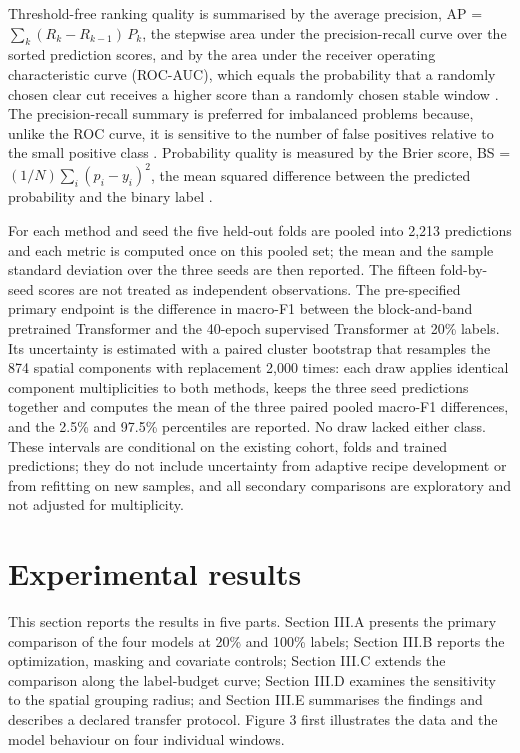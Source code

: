 \documentclass[10pt,a4paper,twocolumn]{article}
\begin{document}
Threshold-free ranking quality is summarised by the average precision, AP = $\sum_k (R_k - R_{k-1})\, P_k$, the stepwise area under the precision-recall curve over the sorted prediction scores, and by the area under the receiver operating characteristic curve (ROC-AUC), which equals the probability that a randomly chosen clear cut receives a higher score than a randomly chosen stable window \cite{ref34}. The precision-recall summary is preferred for imbalanced problems because, unlike the ROC curve, it is sensitive to the number of false positives relative to the small positive class \cite{ref33,ref32}. Probability quality is measured by the Brier score, BS = $(1/N)\sum_i (p_i - y_i)^2$, the mean squared difference between the predicted probability and the binary label \cite{ref35}.

For each method and seed the five held-out folds are pooled into 2,213 predictions and each metric is computed once on this pooled set; the mean and the sample standard deviation over the three seeds are then reported. The fifteen fold-by-seed scores are not treated as independent observations. The pre-specified primary endpoint is the difference in macro-F1 between the block-and-band pretrained Transformer and the 40-epoch supervised Transformer at 20\% labels. Its uncertainty is estimated with a paired cluster bootstrap \cite{ref36} that resamples the 874 spatial components with replacement 2,000 times: each draw applies identical component multiplicities to both methods, keeps the three seed predictions together and computes the mean of the three paired pooled macro-F1 differences, and the 2.5\% and 97.5\% percentiles are reported. No draw lacked either class. These intervals are conditional on the existing cohort, folds and trained predictions; they do not include uncertainty from adaptive recipe development or from refitting on new samples, and all secondary comparisons are exploratory and not adjusted for multiplicity.

\section{Experimental results}
This section reports the results in five parts. Section III.A presents the primary comparison of the four models at 20\% and 100\% labels; Section III.B reports the optimization, masking and covariate controls; Section III.C extends the comparison along the label-budget curve; Section III.D examines the sensitivity to the spatial grouping radius; and Section III.E summarises the findings and describes a declared transfer protocol. Figure 3 first illustrates the data and the model behaviour on four individual windows.
\end{document}
